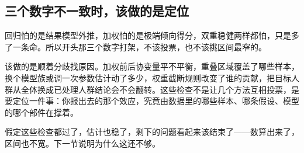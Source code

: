 \subsection{三个数字不一致时，该做的是定位}

回归怕的是结果模型外推，加权怕的是极端倾向得分，双重稳健两样都怕，只是多了一条命。所以开头那三个数字打架，不该投票，也不该挑区间最窄的。

该做的是顺着分歧找原因。加权前后协变量平不平衡，重叠区域覆盖了哪些样本，换个模型族或调一次参数估计动了多少，权重截断规则改变了谁的贡献，把目标人群从全体换成已处理人群结论会不会翻转。这些检查不是让几个方法互相投票，是要定位一件事：你报出去的那个效应，究竟由数据里的哪些样本、哪条假设、模型的哪个部件在撑着。

假定这些检查都过了，估计也稳了，剩下的问题看起来该结束了——数算出来了，区间也不宽。下一节说明为什么这还不够。
